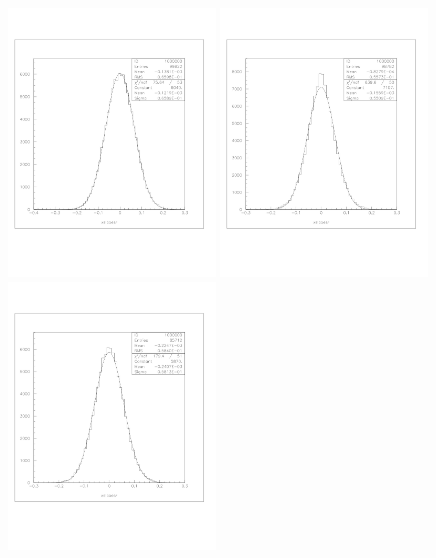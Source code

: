 \documentclass[a4paper]{article}
\begin{document}
\begin{figure}[!htb]
  \centering
  \includegraphics[width=0.49\textwidth]{ex_images/1_020_010_xse.jpg}
  \includegraphics[width=0.49\textwidth]{ex_images/1_020_030_xse.jpg}
  \includegraphics[width=0.49\textwidth]{ex_images/1_020_050_xse.jpg}

\end{figure}
\end{document}
